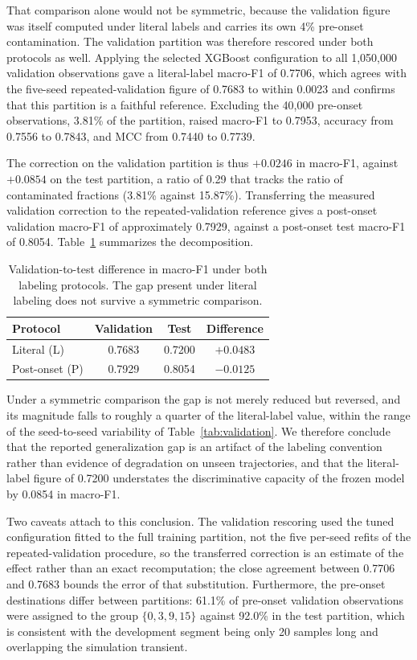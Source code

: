 \documentclass[10pt,twocolumn,a4paper]{article}
\begin{document}
That comparison alone would not be symmetric, because the validation figure
was itself computed under literal labels and carries its own 4\% pre-onset
contamination. The validation partition was therefore rescored under both
protocols as well. Applying the selected XGBoost configuration to all
1,050,000 validation observations gave a literal-label macro-F1 of 0.7706,
which agrees with the five-seed repeated-validation figure of 0.7683 to within
0.0023 and confirms that this partition is a faithful reference. Excluding the
40,000 pre-onset observations, 3.81\% of the partition, raised macro-F1 to
0.7953, accuracy from 0.7556 to 0.7843, and MCC from 0.7440 to 0.7739.

The correction on the validation partition is thus $+0.0246$ in macro-F1,
against $+0.0854$ on the test partition, a ratio of 0.29 that tracks the ratio
of contaminated fractions (3.81\% against 15.87\%). Transferring the measured
validation correction to the repeated-validation reference gives a post-onset
validation macro-F1 of approximately 0.7929, against a post-onset test macro-F1
of 0.8054. Table~\ref{tab:gap} summarizes the decomposition.

\begin{table}[H]
\centering
\caption{Validation-to-test difference in macro-F1 under both labeling
protocols. The gap present under literal labeling does not survive a symmetric
comparison.}
\label{tab:gap}
\small
\begin{tabular}{lccc}
\toprule
Protocol & Validation & Test & Difference\\
\midrule
Literal (L)    & 0.7683 & 0.7200 & $+0.0483$\\
Post-onset (P) & 0.7929 & 0.8054 & $-0.0125$\\
\bottomrule
\end{tabular}
\end{table}

Under a symmetric comparison the gap is not merely reduced but reversed, and
its magnitude falls to roughly a quarter of the literal-label value, within the
range of the seed-to-seed variability of Table~\ref{tab:validation}. We
therefore conclude that the reported generalization gap is an artifact of the
labeling convention rather than evidence of degradation on unseen trajectories,
and that the literal-label figure of 0.7200 understates the discriminative
capacity of the frozen model by 0.0854 in macro-F1.

Two caveats attach to this conclusion. The validation rescoring used the tuned
configuration fitted to the full training partition, not the five per-seed
refits of the repeated-validation procedure, so the transferred correction is
an estimate of the effect rather than an exact recomputation; the close
agreement between 0.7706 and 0.7683 bounds the error of that substitution.
Furthermore, the pre-onset destinations differ between partitions: 61.1\% of
pre-onset validation observations were assigned to the group $\{0,3,9,15\}$
against 92.0\% in the test partition, which is consistent with the development
segment being only 20 samples long and overlapping the simulation transient.
\end{document}
